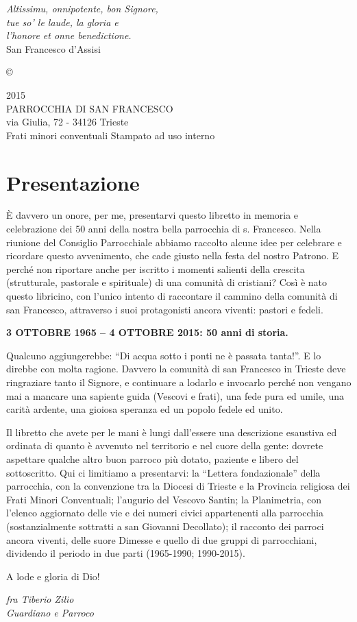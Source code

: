 \thispagestyle{empty}
\vspace*{15ex}
\begin{flushright}
\textit{Altissimu, onnipotente, bon Signore,\\
tue so’ le laude, la gloria e \\
l’honore et onne benedictione.\\}
\vspace{2ex}
\scriptsize{San Francesco d'Assisi}
\end{flushright}
\vfill
\small
\copyright\, 
\begin{minipage}[t]{10cm}
2015\\
PARROCCHIA DI SAN FRANCESCO\\
via Giulia, 72 - 34126 Trieste\\
Frati minori conventuali
\bigbreak 
\noindent Stampato ad uso interno
\end{minipage}
\cleardoublepage

\chapter*{Presentazione}
\label{chap:abstract}
È davvero un onore, per me, presentarvi questo libretto in memoria e celebrazione dei 
50 anni della nostra bella parrocchia di s. Francesco. Nella riunione del Consiglio Parrocchiale 
abbiamo raccolto alcune idee per celebrare e ricordare questo avvenimento, che cade giusto nella 
festa del nostro Patrono. E perché non riportare anche per iscritto i momenti salienti della crescita 
(strutturale, pastorale e spirituale) di una comunità di cristiani? Così è nato questo libricino, con 
l’unico intento di raccontare il cammino della comunità di san Francesco, attraverso i suoi 
protagonisti ancora viventi: pastori e fedeli.
\begin{center}
\bfseries
3 OTTOBRE 1965 – 4 OTTOBRE 2015: 50 anni di storia.
\end{center}

\noindent Qualcuno aggiungerebbe: “Di acqua sotto i ponti ne è passata tanta!”. E lo direbbe con molta 
ragione. Davvero la comunità di san Francesco in Trieste deve ringraziare tanto il Signore, e 
continuare a lodarlo e invocarlo perché non vengano mai a mancare una sapiente guida (Vescovi e 
frati), una fede pura ed umile, una carità ardente, una gioiosa speranza ed un popolo fedele ed unito. 

Il libretto che avete per le mani è lungi dall’essere una descrizione esaustiva ed ordinata di 
quanto è avvenuto nel territorio e nel cuore della gente: dovrete aspettare qualche altro buon 
parroco più dotato, paziente e libero del sottoscritto.
Qui ci limitiamo a presentarvi: la “Lettera fondazionale” della parrocchia, con la convenzione tra la 
Diocesi di Trieste e la Provincia religiosa dei Frati Minori Conventuali; l’augurio del Vescovo 
Santin; la Planimetria, con l’elenco aggiornato delle vie e dei numeri civici appartenenti alla 
parrocchia (sostanzialmente sottratti a san Giovanni Decollato); il racconto dei parroci  ancora 
viventi, delle suore Dimesse e quello di due gruppi di parrocchiani, dividendo il periodo in due parti 
(1965-1990; 1990-2015).
 
\noindent A lode e gloria di Dio!
\begin{flushright}
	\textit{fra Tiberio Zilio\\Guardiano e Parroco}
\end{flushright}